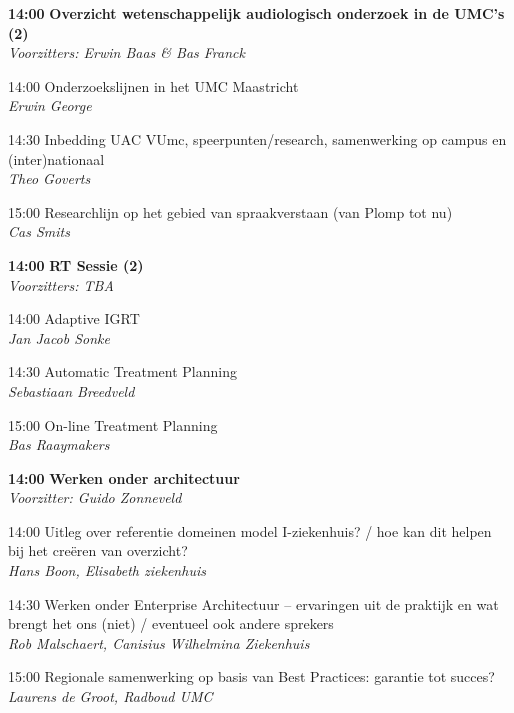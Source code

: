 \documentclass[a4paper,10pt]{report}
\begin{document}
\begin{multicols*}{3}
\vfill

\begin{packed_enum}
\item[\textbf{14:00}] \textbf{Overzicht wetenschappelijk audiologisch onderzoek in de UMC's (2)}\\\textit{Voorzitters: Erwin Baas \& Bas Franck}
\item[14:00] Onderzoekslijnen in het UMC Maastricht\\\textit{Erwin George} 
\item[14:30] Inbedding UAC VUmc, speerpunten/research, samenwerking op campus en (inter)nationaal\\\textit{Theo Goverts}
\item[15:00] Researchlijn op het gebied van spraakverstaan (van Plomp tot nu)\\\textit{Cas Smits}
\end{packed_enum}

\vfill

\begin{packed_enum}
\item[\textbf{14:00}] \textbf{RT Sessie (2)}\\\textit{Voorzitters: TBA}
\item[14:00] Adaptive IGRT\\\textit{Jan Jacob Sonke}
\item[14:30] Automatic Treatment Planning\\\textit{Sebastiaan Breedveld}
\item[15:00] On-line Treatment Planning\\\textit{Bas Raaymakers}
\end{packed_enum}

\vfill
{}
\begin{packed_enum}
\item[\textbf{14:00}] \textbf{Werken onder architectuur}\\\textit{Voorzitter: Guido Zonneveld}
\item[14:00] Uitleg over referentie domeinen model I-ziekenhuis? / hoe kan dit helpen bij het creëren van overzicht?\\\textit{Hans Boon, Elisabeth ziekenhuis}
\item[14:30] Werken onder Enterprise Architectuur – ervaringen uit de praktijk en wat brengt het ons (niet) / eventueel ook andere sprekers \\\textit{Rob Malschaert, Canisius Wilhelmina Ziekenhuis} 
\item[15:00] Regionale samenwerking op basis van Best Practices: garantie tot succes? \\\textit{Laurens de Groot, Radboud UMC} 
\end{packed_enum}


\end{multicols*}
\end{document}
